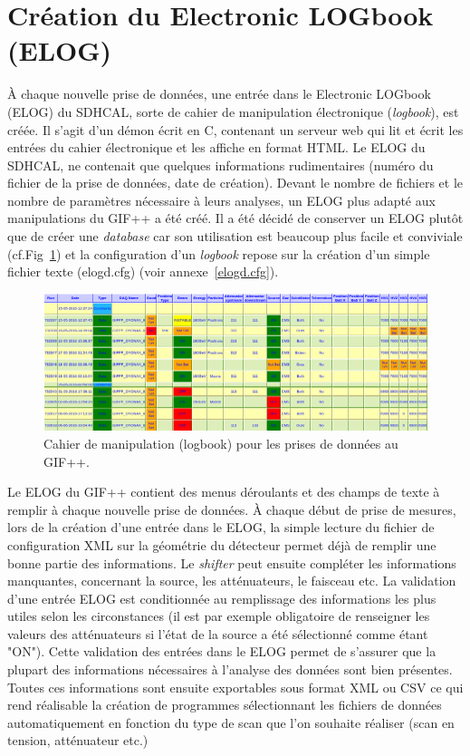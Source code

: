\section{Création du Electronic LOGbook (ELOG)}
\vspace*{-0.4cm}
À chaque nouvelle prise de données, une entrée dans le Electronic LOGbook (ELOG) \cite{ELOG} du SDHCAL, sorte de cahier de manipulation électronique (\textit{logbook}), est créée. Il s'agit d'un démon écrit en C, contenant un serveur web qui lit et écrit les entrées du cahier électronique et les affiche en format HTML. Le ELOG du SDHCAL, ne contenait que quelques informations rudimentaires (numéro du fichier de la prise de données, date de création). Devant le nombre de fichiers et le nombre de paramètres nécessaire à leurs analyses, un ELOG plus adapté aux manipulations du GIF++ a été créé. Il a été décidé de conserver un ELOG plutôt que de créer une \textit{database} car son utilisation est beaucoup plus facile  et conviviale (cf.Fig~\ref{ELOG}) et la configuration d'un \textit{logbook} repose sur la création d'un simple fichier texte (elogd.cfg) (voir annexe~\ref{elogd.cfg}).

\begin{figure}[!ht]
	\centering
	\includegraphics[width=0.75\linewidth]{GLA/ELOG2.png}
	\caption{Cahier de manipulation (logbook) pour les prises de données au GIF++.}
	\label{ELOG}
\end{figure}

Le ELOG du GIF++ contient des menus déroulants et des champs de texte à remplir à chaque nouvelle prise de données. À chaque début de prise de mesures, lors de la création d'une entrée dans le ELOG, la simple lecture du fichier de configuration XML sur la géométrie du détecteur permet déjà de remplir une bonne partie des informations. Le \textit{shifter} peut ensuite compléter les informations manquantes, concernant la source, les atténuateurs, le faisceau etc. La validation d'une entrée ELOG est conditionnée au remplissage des informations les plus utiles selon les circonstances (il est par exemple obligatoire de renseigner les valeurs des atténuateurs si l'état de la source a été sélectionné comme étant "ON"). Cette validation des entrées dans le ELOG permet de s'assurer que la plupart des informations nécessaires à l'analyse des données sont bien présentes. Toutes ces informations sont ensuite exportables sous format XML ou CSV ce qui rend réalisable la création de programmes sélectionnant les fichiers de données automatiquement en fonction du type de scan que l'on souhaite réaliser (scan en tension, atténuateur etc.)
\vspace*{-0.2cm}
